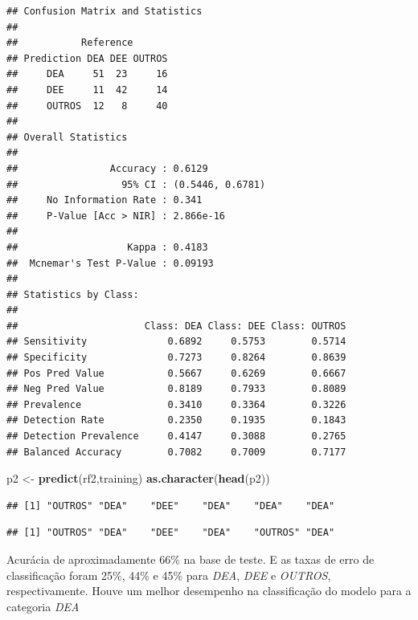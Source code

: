 \documentclass[]{article}
\newenvironment{Shaded}{\begin{snugshade}}{\end{snugshade}}
\newcommand{\KeywordTok}[1]{\textcolor[rgb]{0.13,0.29,0.53}{\textbf{#1}}}
\newcommand{\StringTok}[1]{\textcolor[rgb]{0.31,0.60,0.02}{#1}}
\newcommand{\OperatorTok}[1]{\textcolor[rgb]{0.81,0.36,0.00}{\textbf{#1}}}
\newcommand{\NormalTok}[1]{#1}
\begin{document}
\begin{verbatim}
## Confusion Matrix and Statistics
## 
##           Reference
## Prediction DEA DEE OUTROS
##     DEA     51  23     16
##     DEE     11  42     14
##     OUTROS  12   8     40
## 
## Overall Statistics
##                                           
##                Accuracy : 0.6129          
##                  95% CI : (0.5446, 0.6781)
##     No Information Rate : 0.341           
##     P-Value [Acc > NIR] : 2.866e-16       
##                                           
##                   Kappa : 0.4183          
##  Mcnemar's Test P-Value : 0.09193         
## 
## Statistics by Class:
## 
##                      Class: DEA Class: DEE Class: OUTROS
## Sensitivity              0.6892     0.5753        0.5714
## Specificity              0.7273     0.8264        0.8639
## Pos Pred Value           0.5667     0.6269        0.6667
## Neg Pred Value           0.8189     0.7933        0.8089
## Prevalence               0.3410     0.3364        0.3226
## Detection Rate           0.2350     0.1935        0.1843
## Detection Prevalence     0.4147     0.3088        0.2765
## Balanced Accuracy        0.7082     0.7009        0.7177
\end{verbatim}

\begin{Shaded}
\begin{Highlighting}[]
\NormalTok{p2 <-}\StringTok{ }\KeywordTok{predict}\NormalTok{(rf2,training)}
\KeywordTok{as.character}\NormalTok{(}\KeywordTok{head}\NormalTok{(p2))}
\end{Highlighting}
\end{Shaded}

\begin{verbatim}
## [1] "OUTROS" "DEA"    "DEE"    "DEA"    "DEA"    "DEA"
\end{verbatim}

\begin{Shaded}
\end{Shaded}

\begin{verbatim}
## [1] "OUTROS" "DEA"    "DEE"    "DEA"    "OUTROS" "DEA"
\end{verbatim}

Acurácia de aproximadamente \(66\%\) na base de teste. E as taxas de
erro de classificação foram 25\%, 44\% e 45\% para \emph{DEA},
\emph{DEE} e \emph{OUTROS}, respectivamente. Houve um melhor desempenho
na classificação do modelo para a categoria \emph{DEA}
\end{document}
